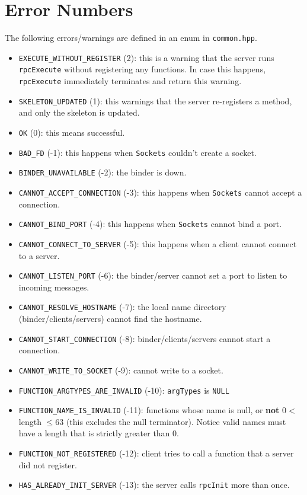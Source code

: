 \section{Error Numbers}
The following errors/warnings are defined in an enum in {\tt common.hpp}.
\begin{itemize}
\item
{\tt EXECUTE\_WITHOUT\_REGISTER} (2): this is a warning that the server runs {\tt rpcExecute} without registering any functions.
In case this happens, {\tt rpcExecute} immediately terminates and return this warning.
\item
{\tt SKELETON\_UPDATED} (1): this warnings that the server re-registers a method, and only the skeleton is updated.
\item
{\tt OK} (0): this means successful.
\item
{\tt BAD\_FD} (-1): this happens when {\tt Sockets} couldn't create a socket.
\item
{\tt BINDER\_UNAVAILABLE} (-2): the binder is down.
\item
{\tt CANNOT\_ACCEPT\_CONNECTION} (-3): this happens when {\tt Sockets} cannot accept a connection.
\item
{\tt CANNOT\_BIND\_PORT} (-4): this happens when {\tt Sockets} cannot bind a port.
\item
{\tt CANNOT\_CONNECT\_TO\_SERVER} (-5): this happens when a client cannot connect to a server.
\item
{\tt CANNOT\_LISTEN\_PORT} (-6): the binder/server cannot set a port to listen to incoming messages.
\item
{\tt CANNOT\_RESOLVE\_HOSTNAME} (-7): the local name directory (binder/clients/servers) cannot find the hostname.
\item
{\tt CANNOT\_START\_CONNECTION} (-8): binder/clients/servers cannot start a connection.
\item
{\tt CANNOT\_WRITE\_TO\_SOCKET} (-9): cannot write to a socket.
\item
{\tt FUNCTION\_ARGTYPES\_ARE\_INVALID} (-10): {\tt argTypes} is {\tt NULL}
\item
{\tt FUNCTION\_NAME\_IS\_INVALID} (-11): functions whose name is null, or {\bf not} $0 < $ length $\le 63$ (this excludes the null terminator).
Notice valid names must have a length that is strictly greater than 0.
\item
{\tt FUNCTION\_NOT\_REGISTERED} (-12): client tries to call a function that a server did not register.
\item
{\tt HAS\_ALREADY\_INIT\_SERVER} (-13): the server calls {\tt rpcInit} more than once.

\end{itemize}
